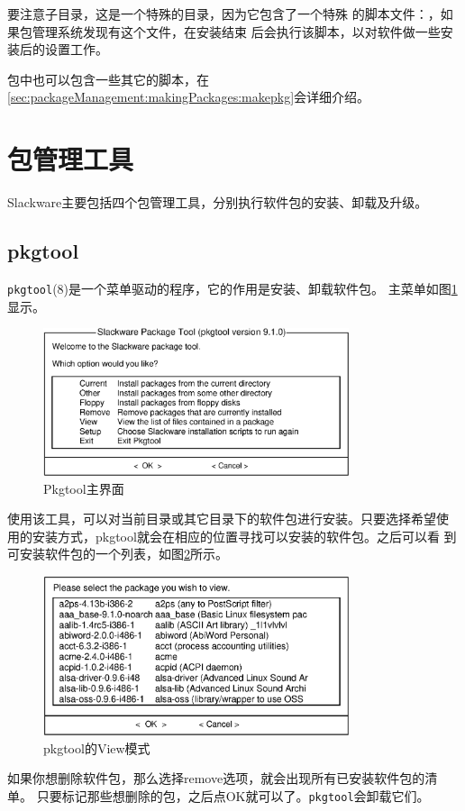 要注意子目录，这是一个特殊的目录，因为它包含了一个特殊
的脚本文件：，如果包管理系统发现有这个文件，在安装结束
后会执行该脚本，以对软件做一些安装后的设置工作。

包中也可以包含一些其它的脚本，在
\ref{sec:packageManagement:makingPackages:makepkg}会详细介绍。

\section{包管理工具}
\label{sec:packageManagement:utilities}
Slackware主要包括四个包管理工具，分别执行软件包的安装、卸载及升级。

\subsection{pkgtool}
\label{sec:packageManagement:utilities:pkgtool}
\texttt{pkgtool}(8)是一个菜单驱动的程序，它的作用是安装、卸载软件包。
主菜单如图\ref{fig:pkgtool}显示。
\begin{figure}[htpb]
  \centering
  \includegraphics[width=0.8\textwidth]{images/package-management/pkgtool.eps}
  \caption{Pkgtool主界面}
  \label{fig:pkgtool}
\end{figure}
使用该工具，可以对当前目录或其它目录下的软件包进行安装。只要选择希望使
用的安装方式，pkgtool就会在相应的位置寻找可以安装的软件包。之后可以看
到可安装软件包的一个列表，如图\ref{fig:pkgtool-view}所示。
\begin{figure}[htpb]
  \centering
  \includegraphics[width=0.8\textwidth]{images/package-management/pkgtool-view.eps}
  \caption{pkgtool的View模式}
  \label{fig:pkgtool-view}
\end{figure}
如果你想删除软件包，那么选择remove选项，就会出现所有已安装软件包的清单。
只要标记那些想删除的包，之后点OK就可以了。\texttt{pkgtool}会卸载它们。

